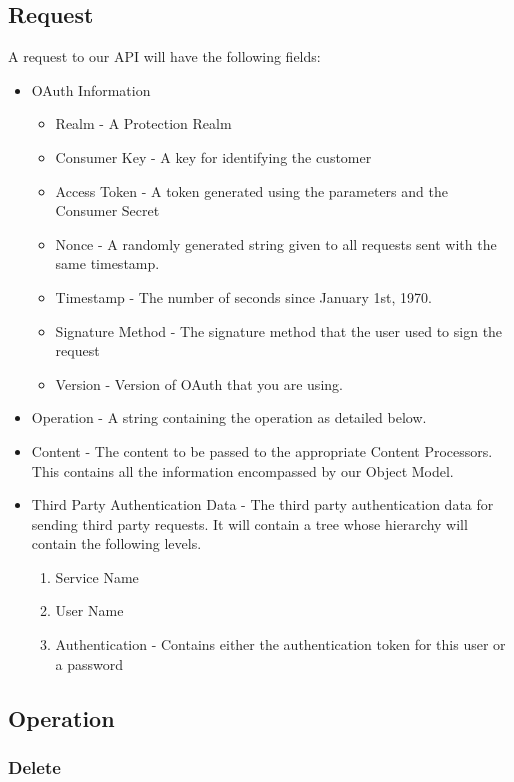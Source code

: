 \documentclass{report}
\begin{document}
		\subsection{Request}
			A request to our API will have the following fields:
			\begin{itemize}
				\item OAuth Information
					\begin{itemize}
						\item Realm - A Protection Realm
						\item Consumer Key - A key for identifying the customer
						\item Access Token - A token generated using the
					   	parameters and the Consumer Secret
						\item Nonce - A randomly generated string given to all
					   	requests sent with the same timestamp.  
						\item Timestamp - The number of seconds since January
					   	1st, 1970.
						\item Signature Method - The signature method that the
					   	user used to sign the request
						\item Version - Version of OAuth that you are using.
					\end{itemize}
				\item Operation - A string containing the operation as detailed 
				  below.
				\item Content - The content to be passed to the appropriate
					Content Processors. This contains all the information encompassed by 
					our Object Model.
				\item Third Party Authentication Data - The third party
				  authentication data for sending third party requests. It will
				  contain a tree whose hierarchy will contain the following
				  levels.
					\begin{enumerate}
						\item Service Name
						\item User Name
						\item Authentication - Contains either the
						  authentication token for this user or a password
					\end{enumerate}
			\end{itemize}
		\subsection{Operation}

			\subsubsection{Delete}
				
\end{document}

